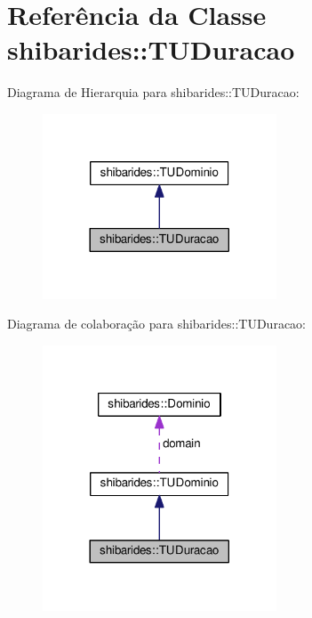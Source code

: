 \hypertarget{classshibarides_1_1TUDuracao}{}\section{Referência da Classe shibarides\+:\+:T\+U\+Duracao}
\label{classshibarides_1_1TUDuracao}


Diagrama de Hierarquia para shibarides\+:\+:T\+U\+Duracao\+:\nopagebreak
\begin{figure}[H]
\begin{center}
\leavevmode
\includegraphics[width=197pt]{classshibarides_1_1TUDuracao__inherit__graph}
\end{center}
\end{figure}


Diagrama de colaboração para shibarides\+:\+:T\+U\+Duracao\+:\nopagebreak
\begin{figure}[H]
\begin{center}
\leavevmode
\includegraphics[width=197pt]{classshibarides_1_1TUDuracao__coll__graph}
\end{center}
\end{figure}
